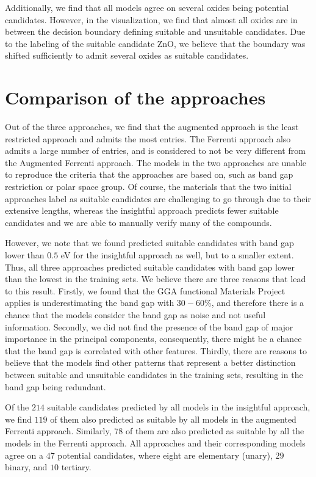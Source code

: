 Additionally, we find that all models agree on several oxides being potential candidates. However, in the visualization, we find that almost all oxides are in between the decision boundary defining suitable and unsuitable candidates. Due to the labeling of the suitable candidate ZnO, we believe that the boundary was shifted sufficiently to admit several oxides as suitable candidates.


\section{Comparison of the approaches}

Out of the three approaches, we find that the augmented approach is the least restricted approach and admits the most entries. The Ferrenti approach also admits a large number of entries, and is considered to not be very different from the Augmented Ferrenti approach. The models in the two approaches are unable to reproduce the criteria that the approaches are based on, such as band gap restriction or polar space group. Of course, the materials that the two initial approaches label as suitable candidates are challenging to go through due to their extensive lengths, whereas the insightful approach predicts fewer suitable candidates and we are able to manually verify many of the compounds.

However, we note that we found predicted suitable candidates with band gap lower than $0.5$ eV for the insightful approach as well, but to a smaller extent. Thus, all three approaches predicted suitable candidates with band gap lower than the lowest in the training sets. We believe there are three reasons that lead to this result. Firstly, we found that the GGA functional Materials Project applies is underestimating the band gap with $30-60\%$, and therefore there is a chance that the models consider the band gap as noise and not useful information. Secondly, we did not find the presence of the band gap of major importance in the principal components, consequently, there might be a chance that the band gap is correlated with other features. Thirdly, there are reasons to believe that the models find other patterns that represent a better distinction between suitable and unsuitable candidates in the training sets, resulting in the band gap being redundant.

Of the $214$ suitable candidates predicted by all models in the insightful approach, we find $119$ of them also predicted as suitable by all models in the augmented Ferrenti approach. Similarly, $78$ of them are also predicted as suitable by all the models in the Ferrenti approach. All approaches and their corresponding models agree on a $47$ potential candidates, where eight are elementary (unary), $29$ binary, and $10$ tertiary.

